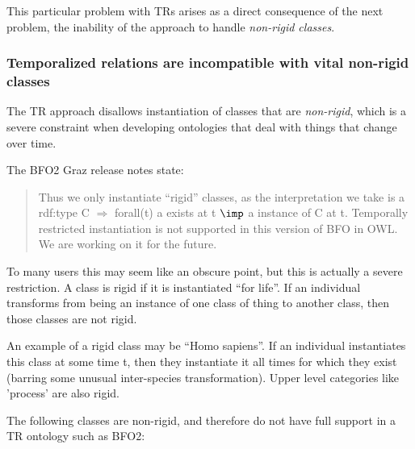 \documentclass{bioinfo}
\begin{document}
This particular problem with TRs arises as a direct consequence of the
next problem, the inability of the approach to handle \emph{non-rigid
  classes}.

\subsubsection{Temporalized relations are incompatible with vital
  non-rigid classes}

The TR approach disallows instantiation of classes that are
\emph{non-rigid}, which is a severe constraint when developing
ontologies that deal with things that change over time.

The BFO2 Graz release notes\cite{Graz} state:

\begin{quotation}

  Thus we only instantiate ``rigid'' classes, as the interpretation we
  take is a rdf:type C $\Rightarrow$ forall(t) a exists at t $\imp$ a
  instance of C at t. Temporally restricted instantiation is not
  supported in this version of BFO in OWL. We are working on it for
  the future.

\end{quotation}

To many users this may seem like an obscure point, but this is
actually a severe restriction. A class is rigid if it is instantiated
``for life''. If an individual transforms from being an instance of
one class of thing to another class, then those classes are not rigid.

An example of a rigid class may be ``Homo sapiens''. If an individual
instantiates this class at some time t, then they instantiate it all
times for which they exist (barring some unusual inter-species
transformation). Upper level categories like 'process' are also rigid.

The following classes are non-rigid, and therefore do not have full
support in a TR ontology such as BFO2:
\end{document}
